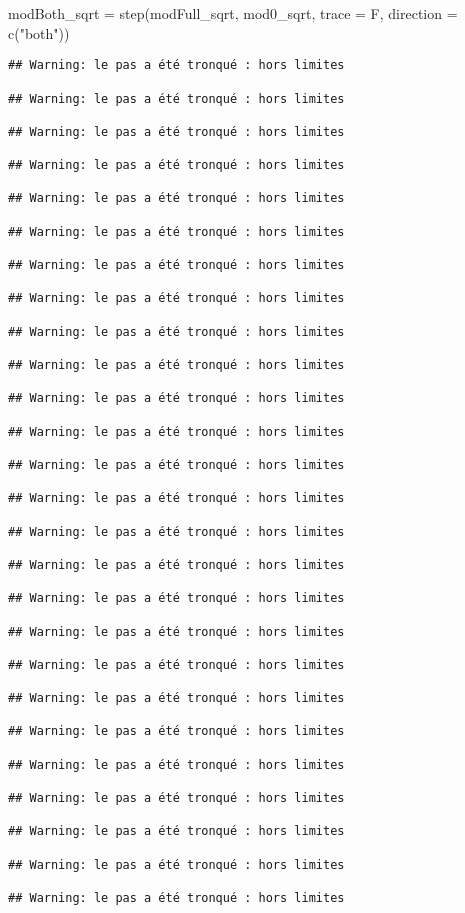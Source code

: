 \documentclass[
]{article}
\newenvironment{Shaded}{\begin{snugshade}}{\end{snugshade}}
\newcommand{\AttributeTok}[1]{\textcolor[rgb]{0.77,0.63,0.00}{#1}}
\newcommand{\FunctionTok}[1]{\textcolor[rgb]{0.00,0.00,0.00}{#1}}
\newcommand{\NormalTok}[1]{#1}
\newcommand{\OtherTok}[1]{\textcolor[rgb]{0.56,0.35,0.01}{#1}}
\newcommand{\StringTok}[1]{\textcolor[rgb]{0.31,0.60,0.02}{#1}}
\begin{document}
\begin{Shaded}
\begin{Highlighting}[]
\NormalTok{modBoth\_sqrt }\OtherTok{=} \FunctionTok{step}\NormalTok{(modFull\_sqrt, mod0\_sqrt, }\AttributeTok{trace =}\NormalTok{ F, }\AttributeTok{direction =} \FunctionTok{c}\NormalTok{(}\StringTok{"both"}\NormalTok{))}
\end{Highlighting}
\end{Shaded}

\begin{verbatim}
## Warning: le pas a été tronqué : hors limites

## Warning: le pas a été tronqué : hors limites

## Warning: le pas a été tronqué : hors limites

## Warning: le pas a été tronqué : hors limites

## Warning: le pas a été tronqué : hors limites

## Warning: le pas a été tronqué : hors limites

## Warning: le pas a été tronqué : hors limites

## Warning: le pas a été tronqué : hors limites

## Warning: le pas a été tronqué : hors limites

## Warning: le pas a été tronqué : hors limites

## Warning: le pas a été tronqué : hors limites

## Warning: le pas a été tronqué : hors limites

## Warning: le pas a été tronqué : hors limites

## Warning: le pas a été tronqué : hors limites

## Warning: le pas a été tronqué : hors limites

## Warning: le pas a été tronqué : hors limites

## Warning: le pas a été tronqué : hors limites

## Warning: le pas a été tronqué : hors limites

## Warning: le pas a été tronqué : hors limites

## Warning: le pas a été tronqué : hors limites

## Warning: le pas a été tronqué : hors limites

## Warning: le pas a été tronqué : hors limites

## Warning: le pas a été tronqué : hors limites

## Warning: le pas a été tronqué : hors limites

## Warning: le pas a été tronqué : hors limites

## Warning: le pas a été tronqué : hors limites
\end{verbatim}
\end{document}
